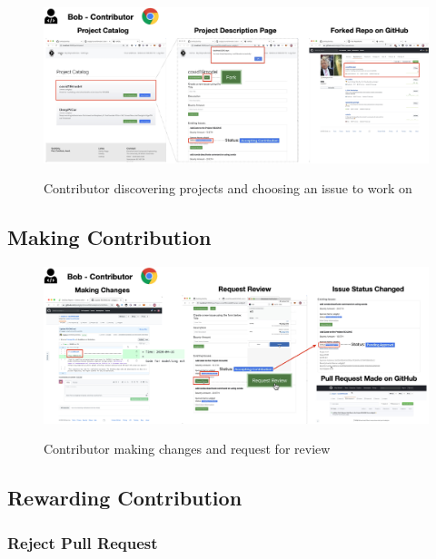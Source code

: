 \documentclass[12pt]{article}
\renewcommand{\_}{\kern-1.5pt\textunderscore\kern-1.5pt}
\begin{document}
\begin{figure}[H]
	\centering
	\includegraphics[width=16.5cm]{graphs/52. discover_1.png}\\
	\caption{Contributor discovering projects and choosing an issue to work on}
	\label{fig:discover1}
\end{figure}


\subsection{Making Contribution}
\begin{figure}[H]
	\centering
	\includegraphics[width=16.5cm]{graphs/53. contribute_1.png}\\
	\caption{Contributor making changes and request for review}
	\label{fig:contribute1}
\end{figure}

\subsection{Rewarding Contribution}


\subsubsection{Reject Pull Request}
\end{document}
